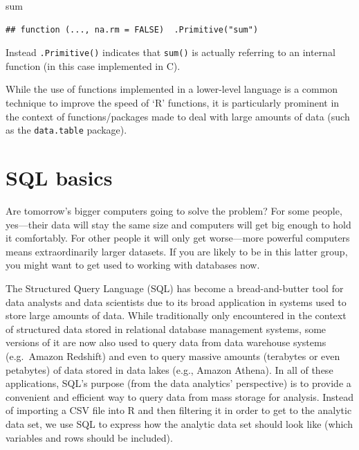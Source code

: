 \documentclass[
  12pt,
]{style/krantz}
\newenvironment{Shaded}{\begin{snugshade}}{\end{snugshade}}
\newcommand{\NormalTok}[1]{#1}
\renewenvironment{quote}{\begin{VF}}{\end{VF}}
\begin{document}
\begin{Shaded}
\begin{Highlighting}[]
\NormalTok{sum}
\end{Highlighting}
\end{Shaded}

\begin{verbatim}
## function (..., na.rm = FALSE)  .Primitive("sum")
\end{verbatim}

Instead \texttt{.Primitive()} indicates that \texttt{sum()} is actually referring to an internal function (in this case implemented in C).

While the use of functions implemented in a lower-level language is a common technique to improve the speed of `R' functions, it is particularly prominent in the context of functions/packages made to deal with large amounts of data (such as the \texttt{data.table} package).

\hypertarget{sql-basics}{%
\section{SQL basics}\label{sql-basics}}

\begin{quote}
Are tomorrow's bigger computers going to solve the problem? For some people,
yes---their data will stay the same size and computers will get big enough to
hold it comfortably. For other people it will only get worse---more powerful
computers means extraordinarily larger datasets. If you are likely to be in this
latter group, you might want to get used to working with databases now.
\end{quote}

\citep{burns_2011}

The Structured Query Language (SQL) has become a bread-and-butter tool for data analysts and data scientists due to its broad application in systems used to store large amounts of data. While traditionally only encountered in the context of structured data stored in relational database management systems, some versions of it are now also used to query data from data warehouse systems (e.g.~Amazon Redshift) and even to query massive amounts (terabytes or even petabytes) of data stored in data lakes (e.g., Amazon Athena). In all of these applications, SQL's purpose (from the data analytics' perspective) is to provide a convenient and efficient way to query data from mass storage for analysis. Instead of importing a CSV file into R and then filtering it in order to get to the analytic data set, we use SQL to express how the analytic data set should look like (which variables and rows should be included).
\end{document}
